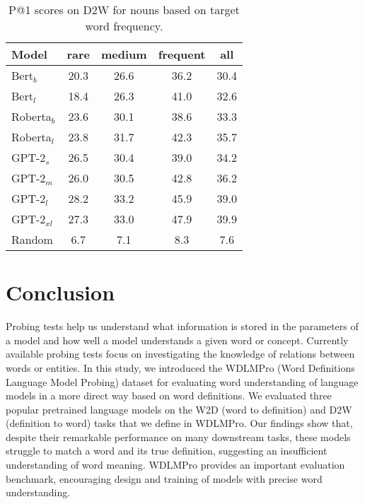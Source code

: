 \documentclass[11pt,a4paper]{article}
\begin{document}
\begin{table}
    \centering
    \begin{tabular}{l|cccc}
    \hline
        \textbf{Model} & \textbf{rare} & \textbf{medium} & \textbf{frequent} & \textbf{all}\\ \hline
     Bert$_{b}$ & 20.3 & 26.6 & 36.2 & 30.4 \\
     Bert$_{l}$ & 18.4 & 26.3 & 41.0 & 32.6 \\
     Roberta$_{b}$ & 23.6 & 30.1 & 38.6 & 33.3 \\
     Roberta$_{l}$ & 23.8 & 31.7 & 42.3 & 35.7 \\ \hline
     GPT-2$_{s}$ & 26.5 & 30.4 & 39.0 & 34.2 \\
     GPT-2$_{m}$ & 26.0 & 30.5 & 42.8 & 36.2 \\
     GPT-2$_{l}$ & 28.2 & 33.2 & 45.9 & 39.0 \\
     GPT-2$_{xl}$ & 27.3 & 33.0 & 47.9 & 39.9 \\ \hline
     Random & 6.7 & 7.1 & 8.3 & 7.6 \\ \hline 
     
    \end{tabular}
    \caption{P@1 scores on D2W for  nouns based on target word frequency.}
    \label{tab:freq_results_find_the_word}
\end{table}


\section{Conclusion}

Probing tests help us understand what information
is stored in the parameters of a model and how well a model
understands a given word or concept. Currently available
probing tests focus on investigating the 
knowledge of relations between words or entities. In this study, we
introduced the WDLMPro (Word Definitions Language Model Probing)
dataset for evaluating word understanding of language models
in a more direct way based on word definitions. We evaluated
three popular pretrained language models on
the W2D (word to definition) and D2W (definition to word)
tasks that we define in
WDLMPro. Our findings show that, despite their remarkable
performance on many downstream tasks, these models struggle
to match a word and its true definition, suggesting an
insufficient understanding of word meaning. WDLMPro provides an
important evaluation benchmark, encouraging design and
training of models with precise word understanding.



\end{document}
